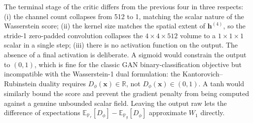 
The terminal stage of the critic differs from the previous four in
three respects: (i) the channel count collapses from 512 to 1, matching
the scalar nature of the Wasserstein score; (ii) the kernel size
matches the spatial extent of $\mathbf{h}^{(4)}$, so the stride-1
zero-padded convolution collapses the $4 \times 4 \times 512$ volume to
a $1 \times 1 \times 1$ scalar in a single step; (iii) there is no
activation function on the output. The absence of a final activation is
deliberate. A sigmoid would constrain the output to $(0, 1)$, which is
fine for the classic GAN binary-classification objective but
incompatible with the Wasserstein-1 dual formulation: the
Kantorovich--Rubinstein duality requires
$D_\phi(\mathbf{x}) \in \mathbb{R}$, not $D_\phi(\mathbf{x}) \in (0,
1)$. A tanh would similarly bound the score and prevent the gradient
penalty from being computed against a genuine unbounded scalar field.
Leaving the output raw lets the difference of expectations
$\mathbb{E}_{\mathbb{P}_r}[D_\phi] - \mathbb{E}_{\mathbb{P}_g}[D_\phi]$
approximate $W_1$ directly.
